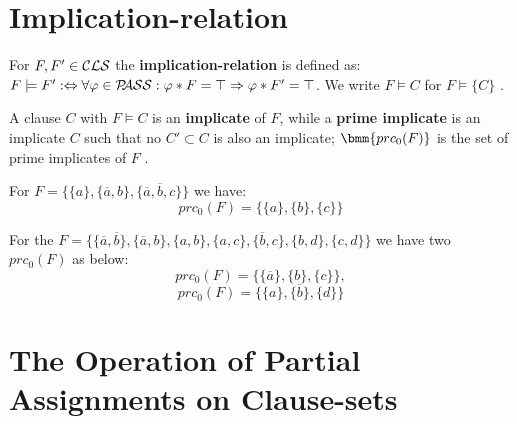 \documentclass[12pt]{book}
\begin{document}
\section{Implication-relation}
\label{sec:Implication-relation}

\begin{defi}\label{def:imp1}
For $F, F' \in \mathcal{CLS}$ the \textbf{implication-relation} is defined as: 
$F \models F' : \Leftrightarrow  \forall \varphi \in \mathcal{P\hspace{-0.32em}ASS} : \varphi * F = \top \Rightarrow \varphi * F' = \top$. 
We write $F \models C$ for $F \models \{ C \}$ \cite{h5}.
\end{defi}

\begin{defi}\label{def:imp2}
A clause $C$ with $F \models C$ is an \textbf{implicate} of $F$, while a \textbf{prime implicate}
 is an implicate $C$ such that no $C' \subset C$ is also an implicate; $\bmm{prc_0(F)}$ is the set of prime implicates of $F$ \cite{h5}.
\end{defi}

\begin{examp}\label{exp:imp3}
For $F = \{ \{a\}, \{ \overline a, b \}, \{ \overline a, \overline b, c \} \}$ we have:
$$ prc_0(F) = \{ \{a\}, \{ b \}, \{ c \} \} $$
\end{examp}

\begin{examp}\label{exp:imp3}
For the $F= \{ \{ \overline a, \overline b \}, \{ \overline a, b\}, \{ a, b \}, \{ a, c \}, \{ \overline b, c\}, \{ b, d \}, \{ c, d \}\}$ 
we have two $prc_0(F)$ as below:
$$ prc_0(F)=\{ \{ \overline a\}, \{ b\}, \{ c\} \} , $$
$$ prc_0(F)=\{ \{ a\}, \{ \overline b \}, \{ d\} \}$$
\end{examp}
\section{The Operation of Partial Assignments on Clause-sets}
\label{sec:oppasscls}
\end{document}
